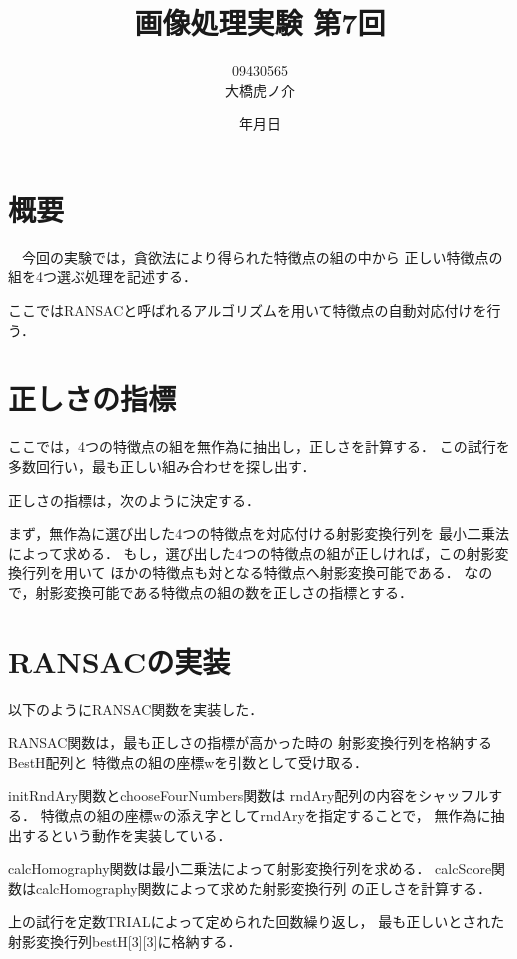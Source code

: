\documentclass[11pt]{jarticle}
\begin{document}
\title{画像処理実験 第7回}
\author{09430565\\大橋虎ノ介}
\date{\number\year 年\number\month 月\number\day 日}
\maketitle

\section{概要}

　今回の実験では，貪欲法により得られた特徴点の組の中から
正しい特徴点の組を4つ選ぶ処理を記述する．

ここではRANSACと呼ばれるアルゴリズムを用いて特徴点の自動対応付けを行う．

\section{正しさの指標}

ここでは，4つの特徴点の組を無作為に抽出し，正しさを計算する．
この試行を多数回行い，最も正しい組み合わせを探し出す．

正しさの指標は，次のように決定する．

まず，無作為に選び出した4つの特徴点を対応付ける射影変換行列を
最小二乗法によって求める．
もし，選び出した4つの特徴点の組が正しければ，この射影変換行列を用いて
ほかの特徴点も対となる特徴点へ射影変換可能である．
なので，射影変換可能である特徴点の組の数を正しさの指標とする．

\section{RANSACの実装}

以下のようにRANSAC関数を実装した．

RANSAC関数は，最も正しさの指標が高かった時の
射影変換行列を格納するBestH配列と
特徴点の組の座標wを引数として受け取る．

initRndAry関数とchooseFourNumbers関数は
rndAry配列の内容をシャッフルする．
特徴点の組の座標wの添え字としてrndAryを指定することで，
無作為に抽出するという動作を実装している．

calcHomography関数は最小二乗法によって射影変換行列を求める．
calcScore関数はcalcHomography関数によって求めた射影変換行列
の正しさを計算する．

上の試行を定数TRIALによって定められた回数繰り返し，
最も正しいとされた射影変換行列bestH[3][3]に格納する．
\end{document}
